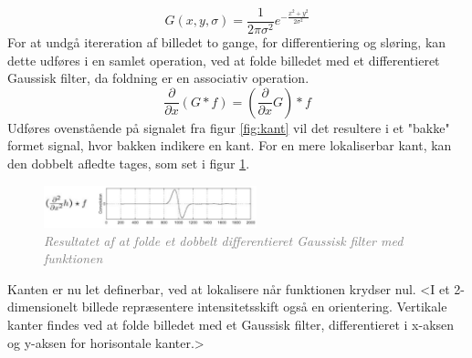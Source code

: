 \begin{equation}
G(x,y,\sigma) = \frac{1}{2 \pi \sigma ^{2}} e^{- \frac{x^{2} + y^{2}}{2 \sigma ^{2}}}
\label{2dgaussian}
\end{equation} 
For at undgå itereration af billedet to gange, for differentiering og sløring, kan dette udføres i en samlet operation, ved at folde billedet med et differentieret Gaussisk filter, da foldning er en associativ operation.
\begin{equation}
\dfrac{\partial}{\partial x}(G \ast f) = (\dfrac{\partial}{\partial x}G) \ast f
\end{equation}
Udføres ovenstående på signalet fra figur \ref{fig:kant} vil det resultere i et "bakke" formet signal, hvor bakken indikere en kant. For en mere lokaliserbar kant, kan den dobbelt afledte tages, som set i figur \ref{fig:deriv}.
\begin{figure}[H]
    \centering
    \includegraphics[width=0.55\textwidth]{fig/8.png}
    \vspace{-1em}   
    \begin{center}
    \caption{\textcolor{gray}{\footnotesize \textit{
     Resultatet af at folde et dobbelt differentieret Gaussisk filter med funktionen}}}
    \label{fig:deriv}
     \end{center}
    \vspace{-2.5em}  
  \end{figure}
\noindent
Kanten er nu let definerbar, ved at lokalisere når funktionen krydser nul. <I et 2-dimensionelt billede repræsentere intensitetsskift også en orientering. Vertikale kanter findes ved at folde billedet med et Gaussisk filter, differentieret i x-aksen og y-aksen for horisontale kanter.>